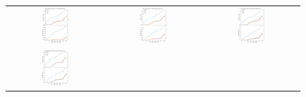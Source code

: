 \documentclass[preprintm,linenumbers]{aastex631}
\begin{document}
		\begin{figure}
			\centering
			\begin{tabular}{c c c}
				\includegraphics[width=0.3\textwidth]{results/DiscoveryTime_MBA_first_year_one_snap_v4_0_10yrs_db_n_visits_4_noDD_noTwi.pdf} &
				\includegraphics[width=0.3\textwidth]{results/DiscoveryTime_NEO_first_year_one_snap_v4_0_10yrs_db_n_visits_4_noDD_noTwi.pdf} &
				\includegraphics[width=0.3\textwidth]{results/DiscoveryTime_PHA_first_year_one_snap_v4_0_10yrs_db_n_visits_4_noDD_noTwi.pdf} \\
				\includegraphics[width=0.3\textwidth]{results/DiscoveryTime_TNO_first_year_one_snap_v4_0_10yrs_db_n_visits_4_noDD_noTwi.pdf} &

\end{tabular}
\end{figure}
\end{document}

